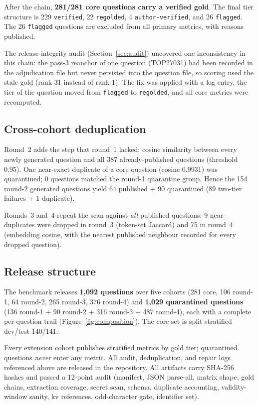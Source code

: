 \documentclass[10pt,a4paper,twocolumn]{article}
\newcommand{\code}[1]{\texttt{#1}}
\begin{document}
After the chain, \textbf{281/281 core questions carry a verified gold}. The final tier structure is 229 \code{verified}, 22 \code{regolded}, 4 \code{author-verified}, and 26 \code{flagged}. The 26 \code{flagged} questions are excluded from all primary metrics, with reasons published.

The release-integrity audit (Section~\ref{sec:audit}) uncovered one inconsistency in this chain: the pass-3 reanchor of one question (TOP27031) had been recorded in the adjudication file but never persisted into the question file, so scoring used the stale gold (rank 31 instead of rank 1). The fix was applied with a log entry, the tier of the question moved from \code{flagged} to \code{regolded}, and all core metrics were recomputed.

\subsection{Cross-cohort deduplication}

Round~2 adds the step that round~1 lacked: cosine similarity between every newly generated question and all 387 already-published questions (threshold 0.95). One near-exact duplicate of a core question (cosine 0.9931) was quarantined; 0 questions matched the round-1 quarantine group. Hence the 154 round-2 generated questions yield 64 published + 90 quarantined (89 two-tier failures + 1 duplicate).

Rounds~3 and~4 repeat the scan against \emph{all} published questions: 9 near-duplicates were dropped in round~3 (token-set Jaccard) and 75 in round~4 (embedding cosine, with the nearest published neighbour recorded for every dropped question).

\subsection{Release structure}

The benchmark releases \textbf{1,092 questions} over five cohorts (281 core, 106 round-1, 64 round-2, 265 round-3, 376 round-4) and \textbf{1,029 quarantined questions} (136 round-1 + 90 round-2 + 316 round-3 + 487 round-4), each with a complete per-question trail (Figure~\ref{fig:composition}). The core set is split stratified dev/test 140/141.

Every extension cohort publishes stratified metrics by gold tier; quarantined questions \emph{never} enter any metric. All audit, deduplication, and repair logs referenced above are released in the repository. All artifacts carry SHA-256 hashes and passed a 12-point audit (manifest, JSON parse-all, matrix shape, gold chains, extraction coverage, secret scan, schema, duplicate accounting, validity-window sanity, kv references, odd-character gate, identifier set).
\end{document}
